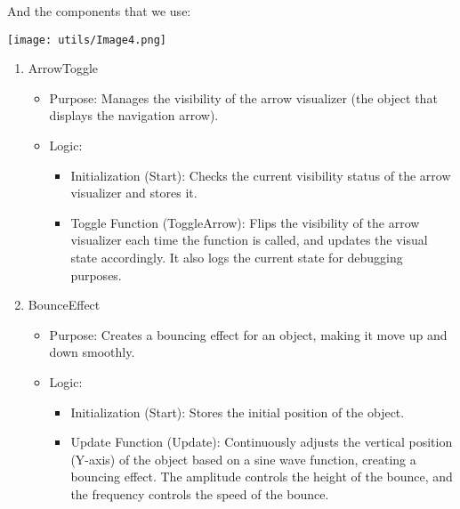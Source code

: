 \documentclass[11pt]{article}
\begin{document}
\begin{multicols}{2}
    And the components that we use:

    \vspace{0,5cm}
    {
	    \centering
	    \texttt{[image: utils/Image4.png]}
    }
    \vspace{0,5cm}

	\begin{enumerate}
	    \item ArrowToggle
	    \begin{itemize}
	        \item Purpose: Manages the visibility of the arrow visualizer (the object that displays the navigation arrow).
	        \item Logic:
	        \begin{itemize}
	            \item Initialization (Start): Checks the current visibility status of the arrow visualizer and stores it.
	            \item Toggle Function (ToggleArrow): Flips the visibility of the arrow visualizer each time the function is called, and updates the visual state accordingly. It also logs the current state for debugging purposes.
	        \end{itemize}
	    \end{itemize}
	
	    \item BounceEffect
	    \begin{itemize}
	        \item Purpose: Creates a bouncing effect for an object, making it move up and down smoothly.
	        \item Logic:
	        \begin{itemize}
	            \item Initialization (Start): Stores the initial position of the object.
	            \item Update Function (Update): Continuously adjusts the vertical position (Y-axis) of the object based on a sine wave function, creating a bouncing effect. The amplitude controls the height of the bounce, and the frequency controls the speed of the bounce.
	        \end{itemize}
	    \end{itemize}
	

\end{enumerate}
\end{multicols}
\end{document}
